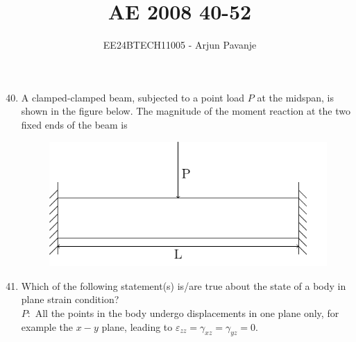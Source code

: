 \documentclass[journal]{IEEEtran}
\begin{document}

\vspace{3cm}
	
\title{AE 2008 40-52}
\author{EE24BTECH11005 - Arjun Pavanje}

{\let\newpage\relax\maketitle}
\begin{enumerate}
\setcounter{enumi}{39}
		\item A clamped-clamped beam, subjected to a point load $P$ at the midspan, is shown in the figure below. The magnitude of the moment reaction at the two fixed ends of the beam is
\begin{figure}[H]
			\centering
			\includegraphics[scale=0.75]{figs/q30.png}
\end{figure}
		\begin{enumerate}
		\end{enumerate}
	\item Which of the following statement(s) is/are true about the state of a body in plane strain condition?\\
		$P:$ All the points in the body undergo displacements in one plane only, for example the $x-y$ plane, leading to $\varepsilon_{zz} = \gamma_{xz}=\gamma_{yz}=0$.\\

\end{enumerate}
\end{document}
